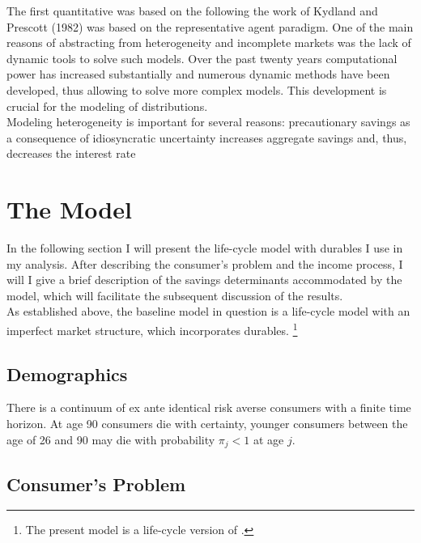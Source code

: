 \documentclass[a4paper,12pt,legno]{article}
\begin{document}
The first quantitative was based on the following the work of Kydland and Prescott (1982) was based on the representative agent paradigm. One of the main reasons of abstracting from heterogeneity and incomplete markets was the lack of dynamic tools to solve such models. \cite{heathcote2009quantitative} Over the past twenty years computational power has increased substantially and numerous dynamic methods have been developed, thus allowing to solve more complex models. This development is crucial for the modeling of distributions. \\
Modeling heterogeneity is important for several reasons: precautionary savings as a consequence of idiosyncratic uncertainty increases aggregate savings and, thus, decreases the interest rate \cite{huggett1993risk}


\section{The Model}
In the following section I will present the life-cycle model with durables I use in my analysis. After describing the consumer's problem and the income process, I will I give a brief description of the savings determinants accommodated by the model, which will facilitate the subsequent discussion of the results. 
\\
As established above, the baseline model in question is a life-cycle model with an imperfect market structure, which incorporates durables. \footnote{The present model is a life-cycle version of  \cite{hintermaier2010}.} 
\subsection{Demographics}
There is a continuum of ex ante identical risk averse consumers with a finite time horizon. At age 90 consumers die with certainty, younger consumers between the age of 26 and 90 may die with probability $\pi_{j} < 1$ at age $j$.
\subsection{Consumer's Problem} 
\end{document}
